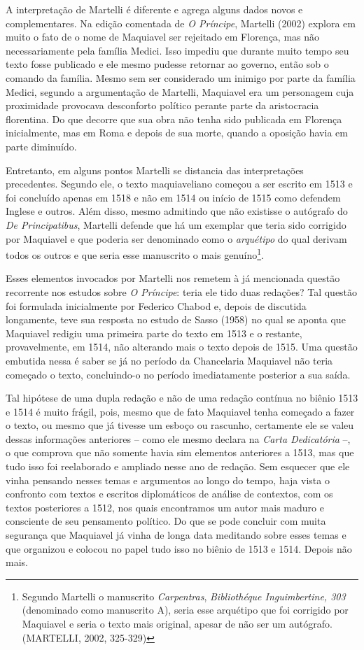 A interpretação de Martelli é diferente e agrega alguns dados novos e
complementares. Na edição comentada de \emph{O Príncipe}, Martelli
(2002) explora em muito o fato de o nome de Maquiavel ser rejeitado em
Florença, mas não necessariamente pela família Medici. Isso impediu que
durante muito tempo seu texto fosse publicado e ele mesmo pudesse
retornar ao governo, então sob o comando da família. Mesmo sem ser
considerado um inimigo por parte da família Medici, segundo a
argumentação de Martelli, Maquiavel era um personagem cuja proximidade
provocava desconforto político perante parte da aristocracia florentina.
Do que decorre que sua obra não tenha sido publicada em Florença
inicialmente, mas em Roma e depois de sua morte, quando a oposição havia
em parte diminuído.

Entretanto, em alguns pontos Martelli se distancia das interpretações
precedentes. Segundo ele, o texto maquiaveliano começou a ser escrito em
1513 e foi concluído apenas em 1518 e não em 1514 ou início de 1515 como
defendem Inglese e outros. Além disso, mesmo admitindo que não existisse
o autógrafo do \emph{De Principatibus}, Martelli defende que há um
exemplar que teria sido corrigido por Maquiavel e que poderia ser
denominado como o \emph{arquétipo} do qual derivam todos os outros e que
seria esse manuscrito o mais genuíno\footnote{Segundo Martelli o
  manuscrito \emph{Carpentras}, \emph{Bibliothéque Inguimbertine, 303}
  (denominado como manuscrito A), seria esse arquétipo que foi corrigido
  por Maquiavel e seria o texto mais original, apesar de não ser um
  autógrafo. (MARTELLI, 2002, 325-329)}.

Esses elementos invocados por Martelli nos remetem à já mencionada
questão recorrente nos estudos sobre \emph{O Príncipe}: teria ele tido
duas redações? Tal questão foi formulada inicialmente por Federico
Chabod e, depois de discutida longamente, teve sua resposta no estudo de
Sasso (1958) no qual se aponta que Maquiavel redigiu uma primeira parte
do texto em 1513 e o restante, provavelmente, em 1514, não alterando
mais o texto depois de 1515. Uma questão embutida nessa é saber se já no
período da Chancelaria Maquiavel não teria começado o texto,
concluindo-o no período imediatamente posterior a sua saída.

Tal hipótese de uma dupla redação e não de uma redação contínua no
biênio 1513 e 1514 é muito frágil, pois, mesmo que de fato Maquiavel
tenha começado a fazer o texto, ou mesmo que já tivesse um esboço ou
rascunho, certamente ele se valeu dessas informações anteriores -- como
ele mesmo declara na \emph{Carta Dedicatória} --, o que comprova que não
somente havia sim elementos anteriores a 1513, mas que tudo isso foi
reelaborado e ampliado nesse ano de redação. Sem esquecer que ele vinha
pensando nesses temas e argumentos ao longo do tempo, haja vista o
confronto com textos e escritos diplomáticos de análise de contextos,
com os textos posteriores a 1512, nos quais encontramos um autor mais
maduro e consciente de seu pensamento político. Do que se pode concluir
com muita segurança que Maquiavel já vinha de longa data meditando sobre
esses temas e que organizou e colocou no papel tudo isso no biênio de
1513 e 1514. Depois não mais.

